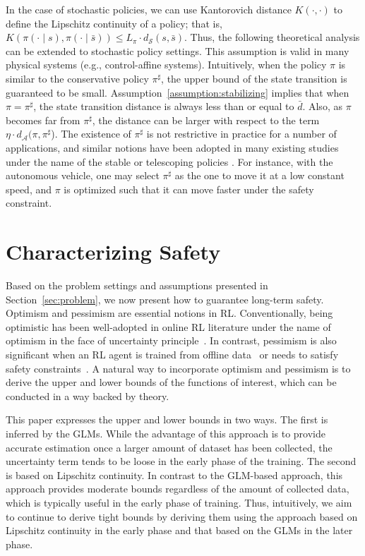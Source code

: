 \documentclass[letterpaper]{article} %
\newcommand{\cA}{\mathcal{A}}
\newcommand{\cS}{\mathcal{S}}
\begin{document}
\noindent
In the case of stochastic policies, we can use Kantorovich distance $K(\cdot, \cdot)$ to define the Lipschitz continuity of a policy; that is, $K(\pi(\cdot \mid s), \pi(\cdot \mid \bar{s})) \le L_\pi \cdot d_\cS(s, \bar{s})$.
Thus, the following theoretical analysis can be extended to stochastic policy settings.
This assumption is valid in many physical systems (e.g., control-affine systems).
Intuitively, when the policy $\pi$ is similar to the conservative policy $\pi^\sharp$, the upper bound of the state transition is guaranteed to be small.
Assumption~\ref{assumption:stabilizing} implies that when $\pi = \pi^\sharp$, the state transition distance is always less than or equal to $\bar{d}$.
Also, as $\pi$ becomes far from $\pi^\sharp$, the distance can be larger with respect to the term $\eta \cdot d_\cA (\pi, \pi^\sharp$). 
The existence of $\pi^\sharp$ is not restrictive in practice for a number of applications, and similar notions have been adopted in many existing studies under the name of the stable or telescoping policies \cite{lin2021perturbation,tsukamoto2021contraction}.
For instance, with the autonomous vehicle, one may select 
$\pi^\sharp$ as the one to move it at a low constant speed, 
and $\pi$ is optimized such that it can move faster under the safety constraint. 


\section{Characterizing Safety}
\label{sec:preliminary}

Based on the problem settings and assumptions presented in Section~\ref{sec:problem}, we now present how to guarantee long-term safety.
Optimism and pessimism are essential notions in RL.
Conventionally, being optimistic has been well-adopted in online RL literature under the name of optimism in the face of uncertainty principle~\cite{strehl2008analysis,auer2007logarithmic}.
In contrast, pessimism is also significant when an RL agent is trained from offline data~\cite{jin2021pessimism,buckman2020importance} or needs to satisfy safety constraints~\cite{bura2022dope}.
%
A natural way to incorporate optimism and pessimism is to derive the upper and lower bounds of the functions of interest, which can be conducted in a way backed by theory.

This paper expresses the upper and lower bounds in two ways.
The first is inferred by the GLMs.
While the advantage of this approach is to provide accurate estimation once a larger amount of dataset has been collected, the uncertainty term tends to be loose in the early phase of the training.
The second is based on Lipschitz continuity.
In contrast to the GLM-based approach, this approach provides moderate bounds regardless of the amount of collected data, which is typically useful in the early phase of training.
Thus, intuitively, we aim to continue to derive tight bounds by deriving them using the approach based on Lipschitz continuity in the early phase and that based on the GLMs in the later phase.  
\end{document}
